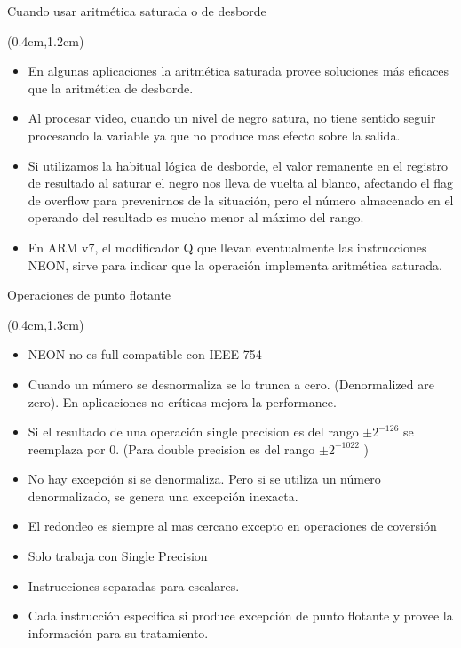 \begin{frame}{Cuando usar aritmética saturada o de desborde}
 \begin{textblock*}{\textwidth}(0.4cm,1.2cm)
  \begin{itemize}[<+(1)->] \justifying  \parskip 0.2cm
   \item En algunas aplicaciones la aritmética saturada provee soluciones más eficaces que la aritmética de desborde. 
   \item Al procesar video, cuando un nivel de negro satura, no tiene sentido seguir procesando la variable ya que no produce mas efecto sobre la salida. 
   \item Si utilizamos la habitual lógica de desborde, el valor remanente en el registro de resultado al saturar el negro nos lleva de vuelta al blanco, afectando el flag de overflow para prevenirnos de la situación, pero el número almacenado en el operando del resultado es mucho menor al máximo del rango.
   \item En ARM v7, el modificador Q que llevan eventualmente las instrucciones NEON, sirve para indicar que la operación implementa aritmética saturada.
  \end{itemize}
 \end{textblock*} 
\end{frame}

\begin{frame}{Operaciones de punto flotante}
 \begin{textblock*}{\textwidth}(0.4cm,1.3cm)
  \begin{itemize}[<+(1)->]\justifying
   \item NEON no es full compatible con IEEE-754
   \item Cuando un número se desnormaliza se lo trunca a cero. (Denormalized are zero). En aplicaciones no críticas mejora la performance. 
   \item Si el resultado de una operación single precision es del rango $\pm 2^{-126}$ se reemplaza por 0. (Para double precision es del rango $\pm 2^{-1022}$ )
   \item No hay excepción si se denormaliza. Pero si se utiliza un número denormalizado, se genera una excepción inexacta.
   \item El redondeo es siempre al mas cercano excepto en operaciones de coversión
   \item Solo trabaja con Single Precision
   \item Instrucciones separadas para escalares.
   \item Cada instrucción especifica si produce excepción de punto flotante y provee la información para su tratamiento.
  \end{itemize}
 \end{textblock*} 
\end{frame}

